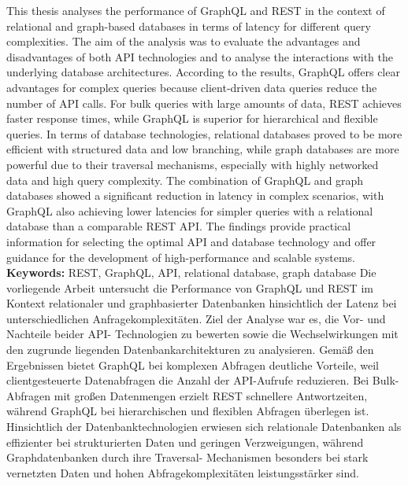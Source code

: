 \label{sec:abstract}
This thesis analyses the performance of GraphQL and REST in the context of relational and graph-based databases in terms of latency for different query complexities. The aim of the analysis was to evaluate the advantages and disadvantages of both API technologies and to analyse the interactions with the underlying database architectures.
\newline
\noindent
According to the results, GraphQL offers clear advantages for complex queries because client-driven data queries reduce the number of API calls. For bulk queries with large amounts of data, REST achieves faster response times, while GraphQL is superior for hierarchical and flexible queries. In terms of database technologies, relational databases proved to be more efficient with structured data and low branching, while graph databases are more powerful due to their traversal mechanisms, especially with highly networked data and high query complexity.
\newline
\noindent
The combination of GraphQL and graph databases showed a significant reduction in latency in complex scenarios, with GraphQL also achieving lower latencies for simpler queries with a relational database than a comparable REST API. The findings provide practical information for selecting the optimal API and database technology and offer guidance for the development of high-performance and scalable systems.
\newline
\noindent
\textbf{Keywords:} REST, GraphQL, API, relational database, graph database
\newpage
{} %
\label{sec:zusammenfassung}
Die vorliegende Arbeit untersucht die Performance von GraphQL und REST im Kontext relationaler und graphbasierter Datenbanken hinsichtlich der Latenz bei unterschiedlichen Anfragekomplexitäten. Ziel der Analyse war es, die Vor- und Nachteile beider API- Technologien zu bewerten sowie die Wechselwirkungen mit den zugrunde liegenden Datenbankarchitekturen zu analysieren.
\newline
\noindent
Gemäß den Ergebnissen bietet GraphQL bei komplexen Abfragen deutliche Vorteile, weil clientgesteuerte Datenabfragen die Anzahl der API-Aufrufe reduzieren. Bei Bulk-Abfragen mit großen Datenmengen erzielt REST schnellere Antwortzeiten, während GraphQL bei hierarchischen und flexiblen Abfragen überlegen ist. Hinsichtlich der Datenbanktechnologien erwiesen sich relationale Datenbanken als effizienter bei strukturierten Daten und geringen Verzweigungen, während Graphdatenbanken durch ihre Traversal- Mechanismen besonders bei stark vernetzten Daten und hohen Abfragekomplexitäten leistungsstärker sind.
